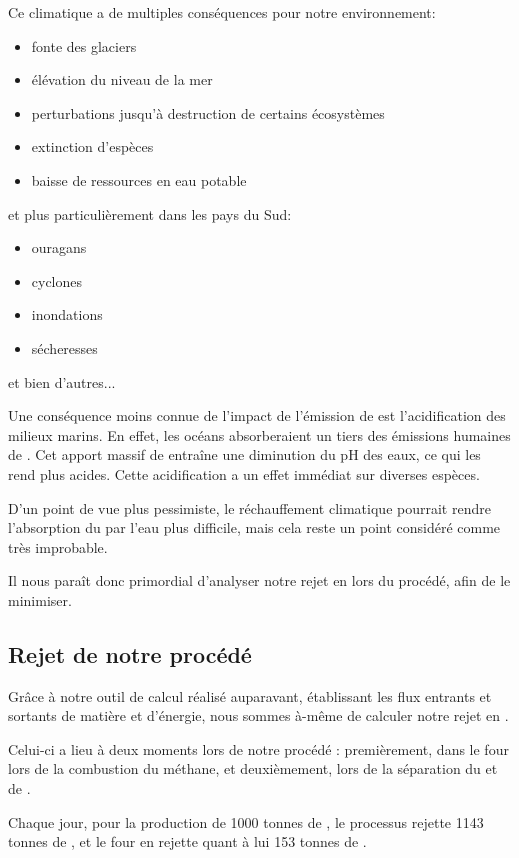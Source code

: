 \documentclass[a4paper, oneside]{scrartcl}
\begin{document}
Ce climatique a de multiples conséquences pour notre environnement:
\begin{itemize}
    \item fonte des glaciers
    \item élévation du niveau de la mer
    \item perturbations jusqu’à destruction de certains écosystèmes
    \item extinction d’espèces
    \item baisse de ressources en eau potable
\end{itemize}
et plus particulièrement dans les pays du Sud:
\begin{itemize}
    \item ouragans
    \item cyclones
    \item inondations
    \item sécheresses
\end{itemize}
et bien d'autres...

 
Une conséquence moins connue de l’impact de l’émission de  est l’acidification des milieux marins. En effet, les océans absorberaient un tiers des émissions humaines de . Cet apport massif de  entraîne une diminution du pH des eaux, ce qui les rend plus acides. Cette acidification a un effet immédiat sur diverses espèces.

D’un point de vue plus pessimiste, le réchauffement climatique pourrait rendre l’absorption du  par l’eau plus difficile, mais cela reste un point considéré comme très improbable.

Il nous paraît donc primordial d'analyser notre rejet en  lors du procédé, afin de le minimiser.

\subsection{Rejet de notre procédé}
Grâce à notre outil de calcul réalisé auparavant, établissant les flux entrants et sortants de matière et d'énergie, nous sommes à-même de calculer notre rejet en .

Celui-ci a lieu à deux moments lors de notre procédé : premièrement, dans le four lors de la combustion du méthane, et deuxièmement, lors de la séparation du  et de .

Chaque jour, pour la production de 1000 tonnes de , le processus rejette 1143 tonnes de , et le four en rejette quant à lui 153 tonnes de .
\end{document}
